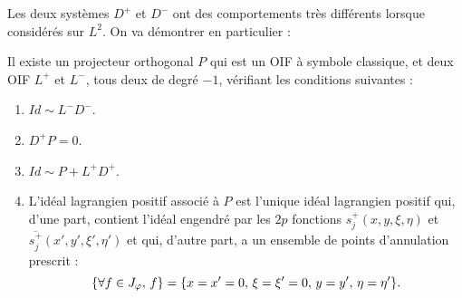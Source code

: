 Les deux systèmes $D^+$ et $D^-$ ont des comportements très différents lorsque considérés sur $L^2$. On va démontrer en particulier :

\begin{prop}
Il existe un projecteur orthogonal $P$ qui est un OIF à symbole classique, et deux OIF $L^+$ et $L^-$, tous deux de degré $-1$, vérifiant les conditions suivantes :

\begin{enumerate}
  \item $Id \sim L^-D^-$.
  \item $D^+P =0$.
  \item $Id \sim P + L^+D^+$.
  \item L'idéal lagrangien positif associé à $P$ est l'unique idéal lagrangien positif qui, d'une part, contient l'idéal engendré par les $2p$ fonctions $s_j^+(x,y,\xi,\eta)$ et  $\overline{s_j^+}(x',y',\xi',\eta')$ et qui, d'autre part, a un ensemble de points d'annulation prescrit :
  \begin{equation*}
  	\{\forall f \in J_{\varphi},\, f\} = \{x=x'=0, \, \xi=\xi'=0,\, y=y',\, \eta=\eta'\}.
  \end{equation*}
\end{enumerate}
\end{prop}
